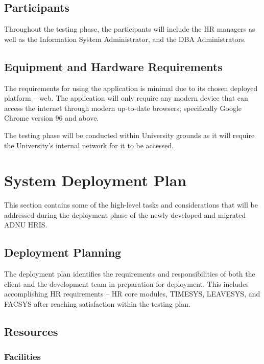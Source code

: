     \subsection{Participants}

    Throughout the testing phase, the participants will include the HR managers as well as the Information System Administrator, and the DBA Administrators.

    \subsection{Equipment and Hardware Requirements}

    The requirements for using the application is minimal due to its chosen deployed platform -- web. The application will only require any modern device that can access the internet through modern up-to-date browsers; specifically Google Chrome version 96 and above. 
    
    The testing phase will be conducted within University grounds as it will require the University's internal network for it to be accessed. 

\section{System Deployment Plan}

This section contains some of the high-level tasks and considerations that will be addressed during the deployment phase of the newly developed and migrated ADNU HRIS.

    \subsection{Deployment Planning}
        
        The deployment plan identifies the requirements and responsibilities of both the client and the development team in preparation for deployment. This includes accomplishing HR requirements -- HR core modules, TIMESYS, LEAVESYS, and FACSYS after reaching satisfaction within the testing plan.

    \subsection{Resources}
        \subsubsection{Facilities}

